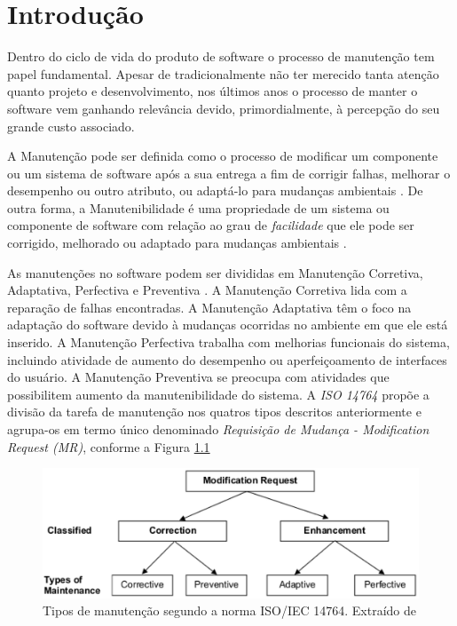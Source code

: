 \documentclass[msc,proposal,hidelot,hideabstract]{ppgccufmg} %
\begin{document}
\chapter{Introdução}
\label{ch:intro}
Dentro do ciclo de vida do produto de software o processo de manutenção tem
papel fundamental. Apesar de tradicionalmente não ter merecido tanta atenção quanto projeto e
desenvolvimento, nos  últimos anos o processo de manter o software vem ganhando
relevância devido, primordialmente, à percepção do seu grande custo associado.

A Manutenção pode ser definida como o processo de modificar um componente ou um
sistema de software após a sua entrega a fim de corrigir falhas, melhorar o
desempenho ou outro atributo, ou adaptá-lo para mudanças ambientais
\cite{159342}. De outra forma, a Manutenibilidade é uma propriedade de um
sistema ou componente de software com relação ao grau de \textit{facilidade}
que ele pode ser corrigido, melhorado ou adaptado para mudanças ambientais \cite{159342}.

As manutenções no software podem ser divididas em Manutenção Corretiva, Adaptativa, Perfectiva e Preventiva \cite{Lientz:1980:SMM:601062,159342}. A
Manutenção Corretiva lida com a reparação de falhas encontradas. A Manutenção
Adaptativa têm o foco na adaptação do software devido à mudanças ocorridas no
ambiente em que ele está inserido. A Manutenção Perfectiva trabalha com
melhorias funcionais do sistema, incluindo atividade de aumento do desempenho
ou aperfeiçoamento de interfaces do usuário. A Manutenção Preventiva se preocupa com atividades
que possibilitem aumento da manutenibilidade do sistema. A \textit{ISO 14764}
\cite{1703974} propõe a divisão da tarefa de manutenção nos quatros tipos
descritos anteriormente e agrupa-os em termo único denominado
\textit{Requisição de Mudança - Modification Request (MR)}, conforme a Figura \ref{fig:modification-request}

\begin{figure}[hbtp]
\centering
\includegraphics[width=.75\textwidth]{../img/modification_request.eps}
\caption{Tipos de manutenção segundo a norma ISO/IEC 14764. Extraído de
  \cite{1703974}}
\label{fig:modification-request}
\end{figure}
\end{document}
